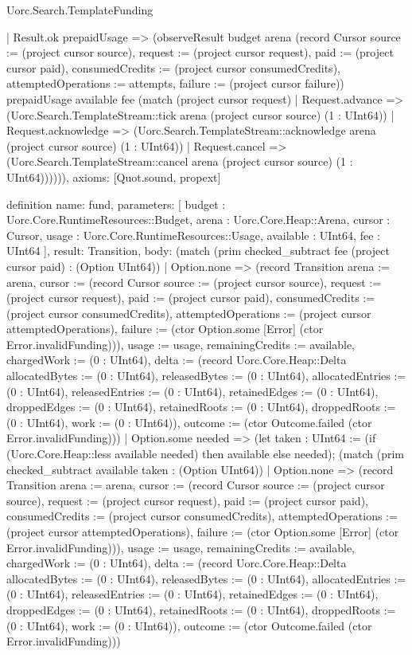 \begin{lexlean}{Uorc.Search.TemplateFunding}
\begin{semanticmodule}
{      | Result.ok prepaidUsage => (observeResult budget arena (record Cursor {source := (project cursor source), request := (project cursor request), paid := (project cursor paid), consumedCredits := (project cursor consumedCredits), attemptedOperations := attempts, failure := (project cursor failure)}) prepaidUsage available fee (match (project cursor request)
        | Request.advance => (Uorc.Search.TemplateStream::tick arena (project cursor source) (1 : UInt64))
        | Request.acknowledge => (Uorc.Search.TemplateStream::acknowledge arena (project cursor source) (1 : UInt64))
        | Request.cancel => (Uorc.Search.TemplateStream::cancel arena (project cursor source) (1 : UInt64)))))),
  axioms: [Quot.sound, propext]
}

definition{
  name: fund,
  parameters: [
    budget : Uorc.Core.RuntimeResources::Budget,
    arena : Uorc.Core.Heap::Arena,
    cursor : Cursor,
    usage : Uorc.Core.RuntimeResources::Usage,
    available : UInt64,
    fee : UInt64
  ],
  result: Transition,
  body: (match (prim checked_subtract fee (project cursor paid) : (Option UInt64))
    | Option.none => (record Transition {arena := arena, cursor := (record Cursor {source := (project cursor source), request := (project cursor request), paid := (project cursor paid), consumedCredits := (project cursor consumedCredits), attemptedOperations := (project cursor attemptedOperations), failure := (ctor Option.some [Error] (ctor Error.invalidFunding))}), usage := usage, remainingCredits := available, chargedWork := (0 : UInt64), delta := (record Uorc.Core.Heap::Delta {allocatedBytes := (0 : UInt64), releasedBytes := (0 : UInt64), allocatedEntries := (0 : UInt64), releasedEntries := (0 : UInt64), retainedEdges := (0 : UInt64), droppedEdges := (0 : UInt64), retainedRoots := (0 : UInt64), droppedRoots := (0 : UInt64), work := (0 : UInt64)}), outcome := (ctor Outcome.failed (ctor Error.invalidFunding))})
    | Option.some needed => (let taken : UInt64 := (if (Uorc.Core.Heap::less available needed) then available else needed); (match (prim checked_subtract available taken : (Option UInt64))
      | Option.none => (record Transition {arena := arena, cursor := (record Cursor {source := (project cursor source), request := (project cursor request), paid := (project cursor paid), consumedCredits := (project cursor consumedCredits), attemptedOperations := (project cursor attemptedOperations), failure := (ctor Option.some [Error] (ctor Error.invalidFunding))}), usage := usage, remainingCredits := available, chargedWork := (0 : UInt64), delta := (record Uorc.Core.Heap::Delta {allocatedBytes := (0 : UInt64), releasedBytes := (0 : UInt64), allocatedEntries := (0 : UInt64), releasedEntries := (0 : UInt64), retainedEdges := (0 : UInt64), droppedEdges := (0 : UInt64), retainedRoots := (0 : UInt64), droppedRoots := (0 : UInt64), work := (0 : UInt64)}), outcome := (ctor Outcome.failed (ctor Error.invalidFunding))})
}
\end{semanticmodule}
\end{lexlean}
